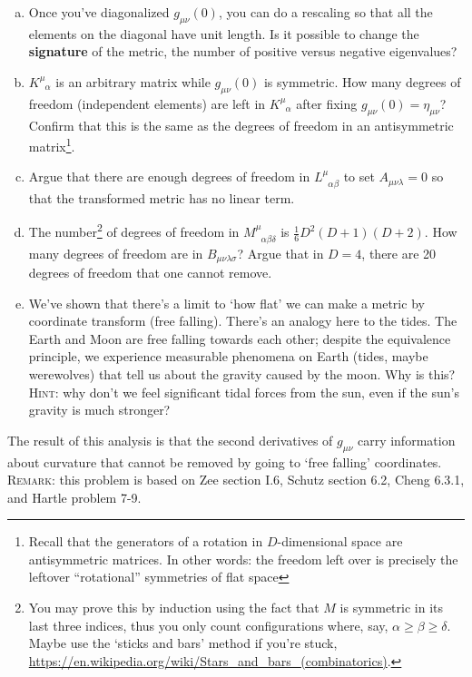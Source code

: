 \documentclass[12pt]{article}
\numberwithin{equation}{section}    %
\begin{document}
\begin{enumerate}[(a)]
	\item Once you've diagonalized $g_{\mu\nu}(0)$, you can do a rescaling so that all the elements on the diagonal have unit length. Is it possible to change the \textbf{signature} of the metric, the number of positive versus negative eigenvalues?
	\item $K^\mu_{\phantom{\mu} \alpha}$ is an arbitrary matrix while $g_{\mu\nu}(0)$ is symmetric. How many degrees of freedom (independent elements) are left in $K^\mu_{\phantom{\mu} \alpha}$ after fixing $g_{\mu\nu}(0) = \eta_{\mu\nu}$? Confirm that this is the same as the degrees of freedom in an antisymmetric matrix\footnote{Recall that the generators of a rotation in $D$-dimensional space are antisymmetric matrices. In other words: the freedom left over is precisely the leftover ``rotational'' symmetries of flat space}.
	\item Argue that there are enough degrees of freedom in $L^\mu_{\phantom{\mu}\alpha\beta}$ to set $A_{\mu\nu\lambda}=0$ so that the transformed metric has no linear term. 
	\item The number\footnote{You may prove this by induction using the fact that $M$ is symmetric in its last three indices, thus you only count configurations where, say, $\alpha\geq \beta\geq \delta$. Maybe use the `sticks and bars' method if you're stuck, \url{https://en.wikipedia.org/wiki/Stars_and_bars_(combinatorics)}.} of degrees of freedom in $M^\mu_{\phantom{\mu}\alpha\beta\delta}$ is $\frac 16 D^2(D+1)(D+2)$. How many degrees of freedom are in $B_{\mu\nu\lambda\sigma}$? Argue that in $D=4$, there are 20 degrees of freedom that one cannot remove. 
	\item We've shown that there's a limit to `how flat' we can make a metric by coordinate transform (free falling). There's an analogy here to the tides. The Earth and Moon are free falling towards each other; despite the equivalence principle, we experience measurable phenomena on Earth (tides, maybe werewolves) that tell us about the gravity caused by the moon. Why is this? \textsc{Hint}: why don't we feel significant tidal forces from the sun, even if the sun's gravity is much stronger?
\end{enumerate}

The result of this analysis is that the second derivatives of $g_{\mu\nu}$ carry information about curvature that cannot be removed by going to `free falling' coordinates. 
%
\textsc{Remark}: this problem is based on Zee section I.6, Schutz section 6.2, Cheng 6.3.1, and Hartle problem 7-9.
\end{document}
